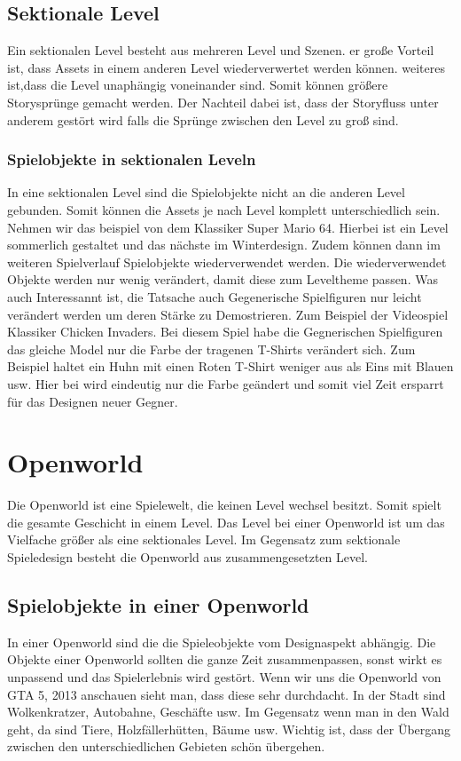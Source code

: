 \subsection {Sektionale Level}
Ein sektionalen Level besteht aus mehreren Level und Szenen. er große Vorteil ist, dass Assets in einem anderen Level wiederverwertet werden können. weiteres ist,dass die Level unaphängig voneinander sind. Somit können größere Storysprünge gemacht werden. Der Nachteil dabei ist, dass der Storyfluss unter anderem gestört wird falls die Sprünge zwischen den Level zu groß sind. 

\subsubsection{Spielobjekte in sektionalen Leveln}
In eine sektionalen Level sind die Spielobjekte nicht an die anderen Level gebunden. Somit können die Assets je nach Level komplett unterschiedlich sein. Nehmen wir das beispiel von dem Klassiker Super Mario 64. Hierbei ist ein Level sommerlich gestaltet und das nächste im Winterdesign. Zudem können dann im weiteren Spielverlauf Spielobjekte wiederverwendet werden. Die wiederverwendet Objekte werden nur wenig verändert, damit diese zum Leveltheme passen. Was auch Interessannt ist, die Tatsache auch Gegenerische Spielfiguren nur leicht verändert werden um deren Stärke zu Demostrieren. Zum Beispiel der Videospiel Klassiker Chicken Invaders. Bei diesem Spiel habe die Gegnerischen Spielfiguren das gleiche Model nur die Farbe der tragenen T-Shirts verändert sich. Zum Beispiel haltet ein Huhn mit einen Roten T-Shirt weniger aus als Eins mit Blauen usw. Hier bei wird eindeutig nur die Farbe geändert und somit viel Zeit ersparrt für das Designen neuer Gegner. 

\section{Openworld}
Die Openworld ist eine Spielewelt, die keinen Level wechsel besitzt. Somit spielt die gesamte Geschicht in einem Level. Das Level bei einer Openworld ist um das Vielfache größer als eine sektionales Level. Im Gegensatz zum sektionale Spieledesign besteht die Openworld aus zusammengesetzten Level.   


\subsection{Spielobjekte in einer Openworld}
In einer Openworld sind die die Spieleobjekte vom Designaspekt abhängig. Die Objekte einer Openworld sollten die ganze Zeit zusammenpassen, sonst wirkt es unpassend und das Spielerlebnis wird gestört. Wenn wir uns die Openworld von GTA 5, 2013 anschauen sieht man, dass diese sehr durchdacht. In der Stadt sind Wolkenkratzer, Autobahne, Geschäfte usw. Im Gegensatz wenn man in den Wald geht, da sind Tiere, Holzfällerhütten, Bäume usw. Wichtig ist, dass der Übergang zwischen den unterschiedlichen Gebieten schön übergehen. 

